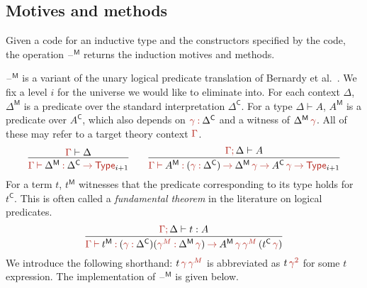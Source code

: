 \documentclass[a4paper,UKenglish]{lipics-v2018}
\newcommand{\ra}{\rightarrow}
\newcommand{\blank}{\mathord{\hspace{1pt}\text{--}\hspace{1pt}}} %
\newcommand{\C}{\mathsf{C}}
\newcommand{\M}{\mathsf{M}}
\newcommand{\1}{\mathsf{1}} \renewcommand{\Pr}{\mathsf{Pr}}
\renewcommand{\in}{\mathbin{\hat:}}
\renewcommand{\hat}[1]{{\color{BrickRed}{#1}}}
\newcommand{\vdashh}{\mathbin{\hat\vdash}}
\newcommand{\rah}{\mathbin{\hat\ra}}
\newcommand{\Type}{\hat{\mathsf{Type}}}
\newcommand{\semicol}{\hat;\,}
\begin{document}

\subsection{Motives and methods}
\label{sec:m}

Given a code for an inductive type and the constructors specified by
the code, the operation $\blank^\M$ returns the induction motives and methods.

$\blank^\M$ is a variant of the unary logical predicate translation of
Bernardy et al.\ \cite{bernardy12parametricity}. We fix a level $i$
for the universe we would like to eliminate into. For each context
$\Delta$, $\Delta^\M$ is a predicate over the standard interpretation
$\Delta^\C$. For a type $\Delta\vdash A$, $A^\M$ is a predicate over
$A^\C$, which also depends on $\hat{\gamma}\in\Delta^\C$ and a witness
of $\Delta^\M\,\hat{\gamma}$. All of these may refer to a target
theory context $\hat{\Gamma}$.
\[
\infer{\hat{\Gamma}\vdashh\Delta^\M \in \Delta^\C\rah \Type_{i+1}}{\hat{\Gamma}\vdash\Delta}
\hspace{2em}
\infer{\hat{\Gamma}\vdashh A^\M \in (\hat{\gamma}\in\Delta^\C)\rah \Delta^\M\,\hat{\gamma}\rah  A^\C\,\hat{\gamma}\rah \Type_{i+1}}{\hat{\Gamma}\semicol\Delta\vdash A}
\]
For a term $t$, $t^\M$ witnesses that the predicate corresponding to
its type holds for $t^\C$. This is often called a \emph{fundamental
  theorem} in the literature on logical predicates.
\[
\infer{\hat{\Gamma}\vdashh t^\M \in (\hat{\gamma}\in\Delta^\C)(\hat{\gamma^M}\in\Delta^\M\,\hat{\gamma})\rah  A^\M\,\hat{\gamma}\,\hat{\gamma^M}\,(t^\C\,\hat{\gamma})}{\hat{\Gamma}\semicol\Delta\vdash t : A}
\]
We introduce the following shorthand: $t\,\hat{\gamma}\,\hat{\gamma^M}$ is
abbreviated as $t\,\hat{\gamma^2}$ for some $t$ expression. The
implementation of $\blank^\M$ is given below.  \begingroup
\allowdisplaybreaks
\end{document}
